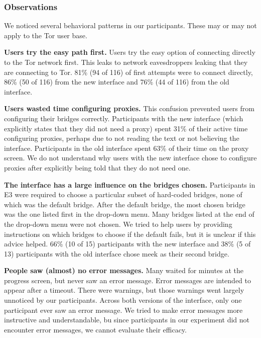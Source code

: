 \documentclass[USenglish,oneside,twocolumn]{article}
\begin{document}
\subsubsection{Observations}
We noticed several behavioral patterns in our participants. These may or may not apply to the Tor user base.\\

\begin{description}
\item {\bfseries Users try the easy path first.} Users try the easy option of connecting directly to the Tor network first. This leaks to network eavesdroppers leaking that they are connecting to Tor.  81\% (94 of 116) of first attempts were to connect directly, 86\% (50 of 116) from the new interface and 76\% (44 of 116) from the old interface.

\item {\bfseries Users wasted time configuring proxies.} This confusion prevented users from configuring their bridges correctly. Participants with the new interface (which explicitly states that they did not need a proxy) spent 31\% of their active time configuring proxies, perhaps due to not reading the text or not believing the interface. Participants in the old interface spent 63\% of their time on the proxy screen. We do not understand why users with the new interface chose to configure proxies after explicitly being told that they do not need one.

\item {\bfseries The interface has a large influence on the bridges chosen.}
Participants in E3 were required to choose a particular subset of hard-coded bridges, none of which was the default bridge. After the default bridge, the most chosen bridge was the one listed first in the drop-down menu. Many bridges listed at the end of the drop-down menu were not chosen. We tried to help users by providing instructions on which bridges to choose if the default fails, but it is unclear if this advice helped. 66\% (10 of 15) participants with the new interface and 38\% (5 of 13) participants with the old interface chose meek as their second bridge.

\item {\bfseries People saw (almost) no error messages.} Many waited for minutes at the progress screen, but never saw an error message. Error messages are intended to appear after a timeout. There were warnings, but those warnings went largely unnoticed by our participants. Across both versions of the interface, only one participant ever saw an error message. We tried to make error messages more instructive and understandable, bu since participants in our experiment did not encounter error messages, we cannot evaluate their efficacy. 


\end{description}
\end{document}
